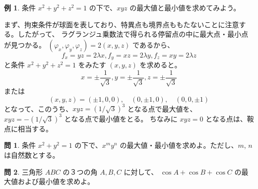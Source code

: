 \documentclass[a4paper]{jsarticle}
\theoremstyle{definition}
\newtheorem{Example}[Theorem]{例}
\newtheorem{Exercise}{問}%
\theoremstyle{remark}
\begin{document}
\begin{Example}
条件 $x^2 + y^2 + z^2 = 1$ の下で、$xyz$ の最大値と最小値を求めてみよう。

まず、拘束条件が球面を表しており、特異点も境界点ももたないことに注意する。したがって、
ラグランジュ乗数法で得られる停留点の中に最大点・最小点が見つかる。
$(\varphi_x,\varphi_y,\varphi_z) = 2(x,y,z)$ であるから、
\[
f_x = yz = 2\lambda x, 
f_y = xz = 2\lambda y, 
f_z = xy = 2\lambda z
\]
と条件 $x^2 + y^2 + z^2 = 1$ をみたす $(x,y,z)$ を求めると。
\[
x = \pm\frac{1}{\sqrt{3}}, 
y = \pm\frac{1}{\sqrt{3}}, 
z = \pm\frac{1}{\sqrt{3}}
\]
または
\[
  (x,y,z) = (\pm 1,0,0),
  \quad
  (0,\pm 1,0),
  \quad
  (0,0,\pm 1)
\]
となって、このうち、$xyz = (1/\sqrt{3})^3$ となる点で最大値を、
$xyz = -(1/\sqrt{3})^3$ となる点で最小値をとる。
ちなみに $xyz=0$ となる点は、鞍点に相当する。
\end{Example}

\begin{Exercise}
条件 $x^2+y^2=1$ の下で、$x^my^n$ の最大値・最小値を求めよ。ただし、$m$, $n$ は自然数とする。  
\end{Exercise}

\begin{Exercise}
三角形 $ABC$ の３つの角 $A, B, C$ に対して、
$\cos A + \cos B + \cos C$ の最大値および最小値を求めよ。
\end{Exercise}
\end{document}
